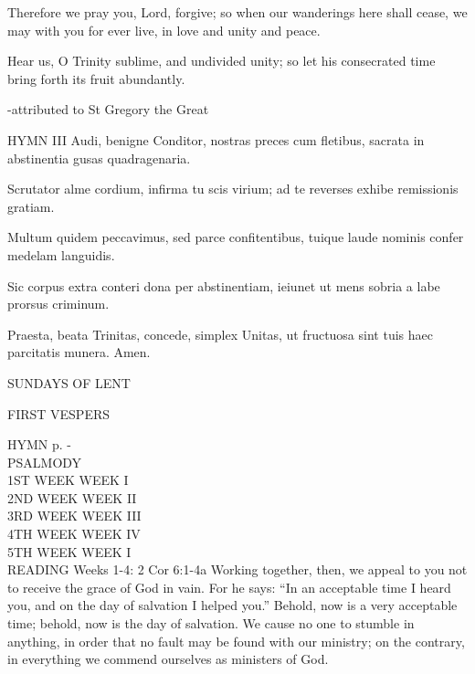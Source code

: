 Therefore we pray you, Lord, forgive;
so when our wanderings here shall cease,
we may with you for ever live,
in love and unity and peace.

Hear us, O Trinity sublime,
and undivided unity;
so let his consecrated time
bring forth its fruit abundantly.

-attributed to St Gregory the Great

HYMN III
Audi, benigne Conditor,
nostras preces cum fletibus,
sacrata in abstinentia
gusas quadragenaria.

Scrutator alme cordium,
infirma tu scis virium;
ad te reverses exhibe
remissionis gratiam.

Multum quidem peccavimus,
sed parce confitentibus,
tuique laude nominis
confer medelam languidis.

Sic corpus extra conteri
dona per abstinentiam,
ieiunet ut mens sobria
a labe prorsus criminum.

Praesta, beata Trinitas,
concede, simplex Unitas,
ut fructuosa sint tuis
haec parcitatis munera. Amen.

SUNDAYS OF LENT
\begin{flushleft}\normalsize{\uppercase{FIRST VESPERS\\}}\end{flushleft}
\small{\uppercase{HYMN} p. \pageref{lent:firstHymn}-\pageref{lent:lastHymn}\\}
\noindent\small{\uppercase{PSALMODY}\\}
\uppercase{1st Week	Week I}\vspace{0.5em}\\
\uppercase{2nd Week	Week II}\vspace{0.5em}\\
\uppercase{3rd Week	Week III}\vspace{0.5em}\\
\uppercase{4th Week	Week IV}\vspace{0.5em}\\
\uppercase{5th Week	Week I}\vspace{0.5em}\\

READING
Weeks 1-4:    2 Cor 6:1-4a    Working together, then, we appeal to you not to receive the grace of God in vain. For he says: “In an acceptable time I heard you, and on the day of salvation I helped you.” Behold, now is a very acceptable time; behold, now is the day of salvation. We cause no one to stumble in anything, in order that no fault may be found with our ministry; on the contrary, in everything we commend ourselves as ministers of God.

